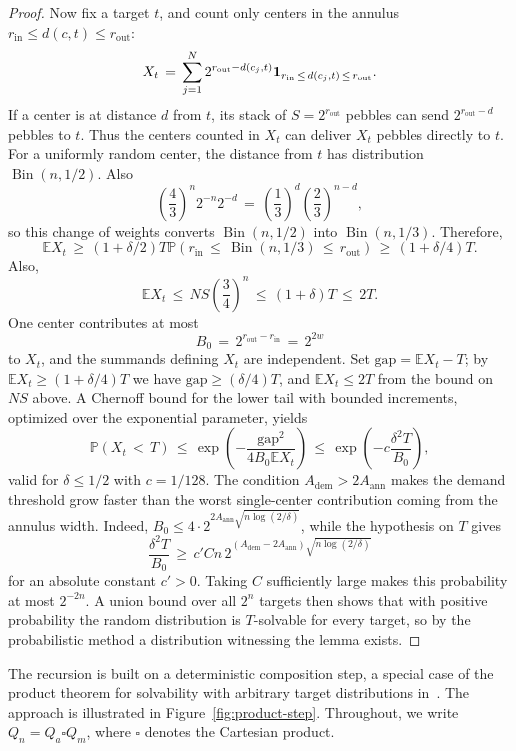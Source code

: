 \documentclass[11pt]{article}
\newcommand{\rin}{r_{\mathrm{in}}}
\newcommand{\rout}{r_{\mathrm{out}}}
\newcommand{\Aann}{A_{\mathrm{ann}}}
\newcommand{\Adem}{A_{\mathrm{dem}}}
\theoremstyle{plain}
\theoremstyle{definition}
\begin{document}
\begin{proof}
Now fix a target $t$, and count only centers in the annulus $\rin\le d(c,t)\le \rout$:
\[
X_t\,=\,\sum_{j=1}^N 2^{\rout-d(c_j,t)}
{\bf 1}_{\rin\,\le\, d(c_j,t)\,\le\, \rout}.
\]
If a center is at distance $d$ from $t$, its stack of $S=2^{\rout}$ pebbles can send
$2^{\rout-d}$ pebbles to $t$.  Thus the centers counted in $X_t$ can deliver $X_t$
pebbles directly to $t$.  For a uniformly random center, the distance from $t$ has
distribution $\operatorname{Bin}(n,1/2)$. Also
\[
\left(\frac43\right)^n2^{-n}2^{-d}
\,=\,\left(\frac13\right)^d\left(\frac23\right)^{n-d},
\]
so this change of weights converts $\operatorname{Bin}(n,1/2)$ into
$\operatorname{Bin}(n,1/3)$. Therefore,
\[
\mathbb E X_t
\,\ge\, (1+\delta/2)T
\mathbb P\!\left(\rin\,\le\, \operatorname{Bin}(n,1/3)\,\le\, \rout\right)
\,\ge\, (1+\delta/4)T.
\]
Also,
\[
\mathbb E X_t\,\le\, NS\left(\frac34\right)^n\,\le\, (1+\delta)T\,\le\, 2T.
\]
One center contributes at most
\[
B_0\,=\,2^{\rout-\rin}\,=\,2^{2w}
\]
to $X_t$, and the summands defining $X_t$ are independent.  Set
$\mathrm{gap}=\mathbb E X_t-T$; by $\mathbb E X_t\ge (1+\delta/4)T$ we have
$\mathrm{gap}\ge (\delta/4)T$, and $\mathbb E X_t\le 2T$ from the bound on $NS$
above.  A Chernoff bound for the lower tail with bounded increments, optimized
over the exponential parameter, yields
\[
\mathbb P(X_t\,<\,T)\,\le\,
\exp\!\left(-\frac{\mathrm{gap}^2}{4B_0\mathbb E X_t}\right)
\,\le\,\exp\!\left(-c\frac{\delta^2T}{B_0}\right),
\]
valid for $\delta\le 1/2$ with $c=1/128$.  The condition $\Adem>2\Aann$ makes the
demand threshold grow faster than the worst single-center contribution coming
from the annulus width. Indeed, $B_0\le 4\cdot 2^{2\Aann\sqrt{n\log(2/\delta)}}$,
while the hypothesis on $T$ gives
\[
\frac{\delta^2T}{B_0}
  \,\ge\, c' C n\,
  2^{(\Adem-2\Aann)\sqrt{n\log(2/\delta)}}
\]
for an absolute constant $c'>0$.  Taking $C$ sufficiently large makes this
probability at most $2^{-2n}$.  A union bound over all $2^n$ targets then shows that
with positive probability the random distribution is $T$-solvable for every target, so
by the probabilistic method a distribution witnessing the lemma exists.
\end{proof}

The recursion is built on a deterministic composition step, a special case of the product
theorem for solvability with arbitrary target distributions in~\cite{HHH}.  The approach is
illustrated in Figure~\ref{fig:product-step}.  Throughout, we write
$Q_n=Q_a\square Q_m$, where $\square$ denotes the Cartesian product.
\label{def:product}
\end{document}
